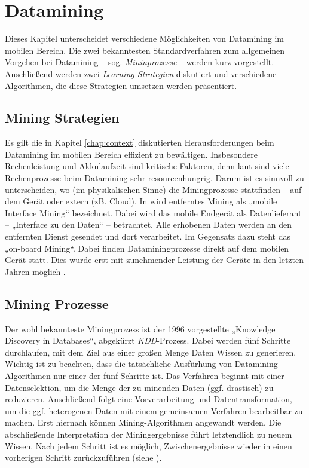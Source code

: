 \chapter{Datamining}
\label{chap:datamining}

Dieses Kapitel unterscheidet verschiedene Möglichkeiten von Datamining im mobilen Bereich. Die zwei bekanntesten Standardverfahren zum allgemeinen Vorgehen bei Datamining -- sog. \textit{Mininprozesse} -- werden kurz vorgestellt. Anschließend werden zwei \textit{Learning Strategien} diskutiert und verschiedene Algorithmen, die diese Strategien umsetzen werden präsentiert.

\section{Mining Strategien}

Es gilt die in Kapitel \ref{chap:context} diskutierten Herausforderungen beim Datamining im mobilen Bereich effizient zu bewältigen. Insbesondere Rechenleistung und Akkulaufzeit sind kritische Faktoren, denn laut \cite{pocket2014} sind viele Rechenprozesse beim Datamining sehr resourcenhungrig. Darum ist es sinnvoll zu unterscheiden, wo (im physikalischen Sinne) die Miningprozesse stattfinden -- auf dem Gerät oder extern (zB. Cloud). In \cite{pocket2014} wird entferntes Mining als „mobile Interface Mining“ bezeichnet. Dabei wird das mobile Endgerät als Datenlieferant -- „Interface zu den Daten“ -- betrachtet. Alle erhobenen Daten werden an den entfernten Dienst gesendet und dort verarbeitet. Im Gegensatz dazu steht das „on-board Mining“. Dabei finden Dataminingprozesse direkt auf dem mobilen Gerät statt. Dies wurde erst mit zunehmender Leistung der Geräte in den letzten Jahren möglich \cite{pocket2014}.

\section{Mining Prozesse}

Der wohl bekannteste Miningprozess ist der 1996 vorgestellte „Knowledge Discovery in Databases“\cite{kdd96}, abgekürzt \textit{KDD}-Prozess. Dabei werden fünf Schritte durchlaufen, mit dem Ziel aus einer großen Menge Daten Wissen zu generieren. Wichtig ist zu beachten, dass die tatsächliche Ausfürhung von Datamining-Algorithmen nur einer der fünf Schritte ist. Das Verfahren beginnt mit einer Datenselektion, um die Menge der zu minenden Daten (ggf. drastisch) zu reduzieren. Anschließend folgt eine Vorverarbeitung und Datentransformation, um die ggf. heterogenen Daten mit einem gemeinsamen Verfahren bearbeitbar zu machen. Erst hiernach können Mining-Algorithmen angewandt werden. Die abschließende Interpretation der Miningergebnisse führt letztendlich zu neuem Wissen. Nach jedem Schritt ist es möglich, Zwischenergebnisse wieder in einen vorherigen Schritt zurückzuführen (siehe \cite{kdd96}).


